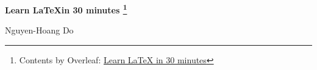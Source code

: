 \begin{titlepage}

\vspace*{\fill}

    \begin{center}

        \Huge
        \textbf{Learn \LaTeX in 30 minutes \footnote{Contents by Overleaf: \href{https://www.overleaf.com/learn/latex/Learn_LaTeX_in_30_minutes}{Learn LaTeX in 30 minutes}}}

        \Large
        \vspace{0.5cm}
        Nguyen-Hoang Do

    \end{center}

\vspace*{\fill}

\end{titlepage}